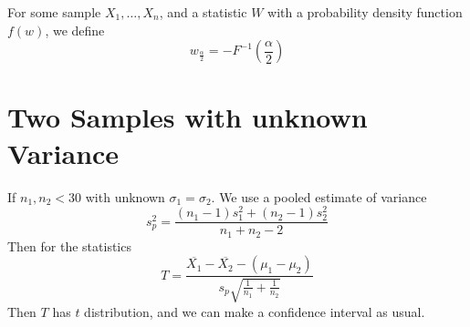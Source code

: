 \documentclass[12pt]{article}
\begin{document}
For some sample $X_1,\dots,X_n$, and a statistic $W$ with a probability density function $f(w)$, we define
$$w_{\frac{\alpha}{2}} = -F^{-1}\left(\frac{\alpha}{2}\right)$$

\section{Two Samples with unknown Variance}
If $n_1,n_2 < 30$ with unknown $\sigma_1=\sigma_2$. We use a pooled estimate of variance
$$s_p^2 = \frac{(n_1-1)s_1^2+(n_2-1)s_2^2}{n_1+n_2-2}$$
Then for the statistics
$$T = \frac{\overline{X_1}-\overline{X_2}-(\mu_1-\mu_2)}{s_p\sqrt{\frac{1}{n_1}+\frac{1}{n_2}}}$$
Then $T$ has $t$ distribution, and we can make a confidence interval as usual.
\end{document}
